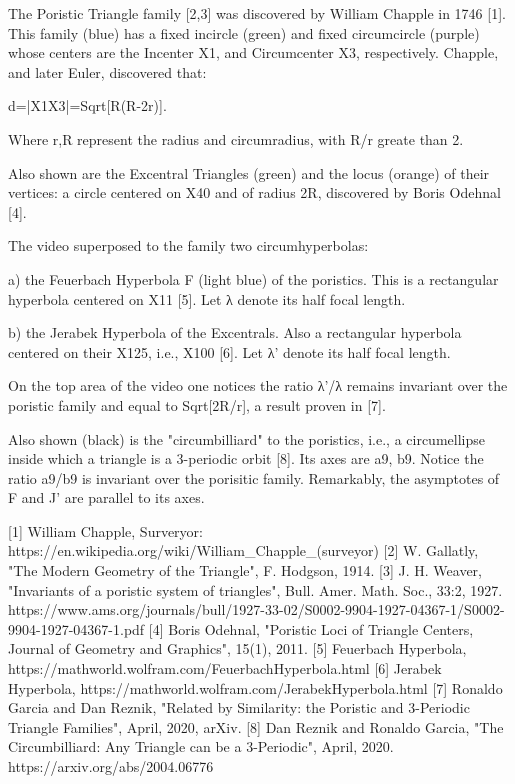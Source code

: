 The Poristic Triangle family [2,3] was discovered by William Chapple in 1746 [1]. This family (blue) has a fixed incircle (green) and fixed circumcircle (purple) whose centers are the Incenter X1, and Circumcenter X3, respectively. Chapple, and later Euler, discovered that:

d=|X1X3|=Sqrt[R(R-2r)].

Where r,R represent the radius and circumradius, with R/r greate than 2.

Also shown are the Excentral Triangles (green) and the locus (orange) of their vertices: a circle centered on X40 and of radius 2R, discovered by Boris Odehnal [4].

The video superposed to the family two circumhyperbolas:

a) the Feuerbach Hyperbola F (light blue) of the poristics. This is a rectangular hyperbola centered on X11 [5]. Let λ denote its half focal length.

b) the Jerabek Hyperbola of the Excentrals. Also a rectangular hyperbola centered on their X125, i.e., X100 [6]. Let λ' denote its half focal length.

On the top area of the video one notices the ratio λ'/λ remains invariant over the poristic family and equal to Sqrt[2R/r], a result proven in [7].

Also shown (black) is the "circumbilliard"  to the poristics, i.e., a circumellipse inside which a triangle is a 3-periodic orbit [8]. Its axes are a9, b9. Notice the ratio a9/b9 is invariant over the porisitic family. Remarkably, the asymptotes of F and J' are parallel to its axes.

[1] William Chapple, Surveryor: https://en.wikipedia.org/wiki/William_Chapple_(surveyor)
[2] W. Gallatly, "The Modern Geometry of the Triangle", F. Hodgson, 1914.
[3] J. H. Weaver, "Invariants of a poristic system of triangles", Bull. Amer. Math. Soc., 33:2, 1927. https://www.ams.org/journals/bull/1927-33-02/S0002-9904-1927-04367-1/S0002-9904-1927-04367-1.pdf
[4] Boris Odehnal, "Poristic Loci of Triangle Centers, Journal of Geometry and Graphics", 15(1), 2011. 
[5] Feuerbach Hyperbola, https://mathworld.wolfram.com/FeuerbachHyperbola.html
[6] Jerabek Hyperbola, https://mathworld.wolfram.com/JerabekHyperbola.html
[7] Ronaldo Garcia and Dan Reznik, "Related by Similarity: the Poristic and 3-Periodic Triangle Families", April, 2020, arXiv.
[8] Dan Reznik and Ronaldo Garcia,  "The Circumbilliard: Any Triangle can be a 3-Periodic", April, 2020. https://arxiv.org/abs/2004.06776